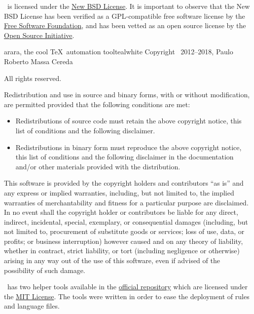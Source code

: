\documentclass[a4paper,twoside,12pt]{memoir}
\begin{document}
\arara\ is licensed under the \href{http://www.opensource.org/licenses/bsd-license.php}{New BSD License}. It is important to observe that the New BSD License has been verified as a GPL-compatible free software license by the \href{http://www.fsf.org/}{Free Software Foundation}, and has been vetted as an open source license by the \href{http://www.opensource.org/}{Open Source Initiative}.

\begin{messagebox}{{arara, the cool \TeX\ automation tool}}{teal}{\icinfo}{white}
Copyright \textcopyright\ 2012--2018, Paulo Roberto Massa Cereda

All rights reserved.

\vspace{1em}

Redistribution and use in source and binary forms, with or without modification, are permitted provided that the following conditions are met:

\begin{itemize}
\item Redistributions of source code must retain the above copyright notice, this list of conditions and the following disclaimer.
\item Redistributions in binary form must reproduce the above copyright notice, this list of conditions and the following disclaimer in the documentation and/or other materials provided with the distribution.
\end{itemize}

This software is provided by the copyright holders and contributors ``as is'' and any express or implied warranties, including, but not limited to, the implied warranties of merchantability and fitness for a particular purpose are disclaimed. In no event shall the copyright holder or contributors be liable for any direct, indirect, incidental, special, exemplary, or consequential damages (including, but not limited to, procurement of substitute goods or services; loss of use, data, or profits; or business interruption) however caused and on any theory of liability, whether in contract, strict liability, or tort (including negligence or otherwise) arising in any way out of the use of this software, even if advised of the possibility of such damage.
\end{messagebox}

\arara\ has two helper tools available in the \href{https://github.com/cereda/arara}{official repository} which are licensed under the \href{http://opensource.org/licenses/MIT}{MIT License}. The tools were written in order to ease the deployment of rules and language files.
\end{document}
